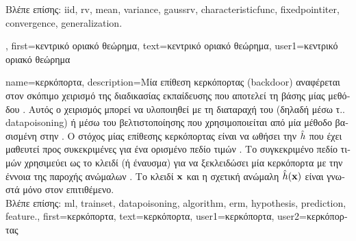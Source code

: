 {{\begin{figure}[H]
		\end{figure}
		\foreignlanguage{greek}{Βλέπε επίσης:} \gls{iid}, \gls{rv}, \gls{mean}, \gls{variance}, \gls{gaussrv}, \gls{characteristicfunc}, \gls{fixedpointiter}, 
		\gls{convergence}, \gls{generalization}.},
	first={\foreignlanguage{greek}{κεντρικό οριακό θεώρημα}},
	text={\foreignlanguage{greek}{κεντρικό οριακό θεώρημα}},
	user1={\foreignlanguage{greek}{κεντρικό οριακό θεώρημα}} %
}

{name={\foreignlanguage{greek}{κερκόπορτα}}, 
	description={\foreignlanguage{greek}{Μία επίθεση κερκόπορτας} 
		(backdoor) \foreignlanguage{greek}{αναφέρεται στον σκόπιμο χειρισμό της διαδικασίας εκπαίδευσης που αποτελεί τη βάσης 
		μίας μεθόδου} . \foreignlanguage{greek}{Αυτός ο χειρισμός μπορεί να υλοποιηθεί με τη διαταραχή του}  
		\foreignlanguage{greek}{(δηλαδή μέσω τ..} \gls{datapoisoning}) \foreignlanguage{greek}{ή μέσω του}  
		 \foreignlanguage{greek}{βελτιστοποίησης που χρησιμοποιείται από μία μέθοδο βασισμένη 
		στην} . \foreignlanguage{greek}{Ο στόχος μίας επίθεσης κερκόπορτας είναι να  
		ωθήσει την}  $\hat{h}$ \foreignlanguage{greek}{που έχει μαθευτεί
		προς συκεκριμένες}  \foreignlanguage{greek}{για ένα ορισμένο πεδίο τιμών} . 
		\foreignlanguage{greek}{Το συγκεκριμένο πεδίο τιμών}  
		\foreignlanguage{greek}{χρησιμεύει ως το κλειδί (ή έναυσμα) για να ξεκλειδώσει μία κερκόπορτα με την έννοια  
		της παροχής ανώμαλων} . \foreignlanguage{greek}{Το κλειδί ${\bf x}$ και η σχετική 
		ανώμαλη}  $\hat{h}({\bf x})$ \foreignlanguage{greek}{είναι γνωστά μόνο στον επιτιθέμενο.}\\
		\foreignlanguage{greek}{Βλέπε επίσης:} \gls{ml}, \gls{trainset}, \gls{datapoisoning}, \gls{algorithm}, \gls{erm}, \gls{hypothesis}, \gls{prediction}, \gls{feature}.},
	first={\foreignlanguage{greek}{κερκόπορτα}},
	text={\foreignlanguage{greek}{κερκόπορτα}},
	user1={\foreignlanguage{greek}{κερκόπορτα}}, %
	user2={\foreignlanguage{greek}{κερκόπορτας}} %
}

